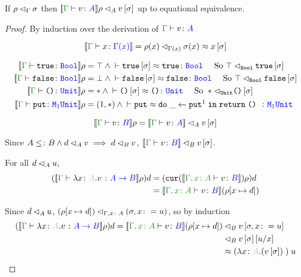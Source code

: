\documentclass{Report}
\begin{document}
\begin{theorem}
    If $\rho \lhd_{\Gamma} \sigma$ then $\logRel{\deno{\gtyperelation{v}{A}}\rho}{A}{v\ssi}$ up to equational equivalence.    
\end{theorem}

\begin{proof}
    By induction over the derivation of $\gtyperelation{v}{A}$

    \begin{equation}
        \deno{\gtyperelation{x}{\G(x)}} = \logRel{\rho(x)}{\G(x)}{\si(x)}\beequiv x\ssi
    \end{equation}

    \begin{align}
        \deno{\gtyperelation{\t}{\B}} \rho & = \top \wedge \zberelation{\t\ssi}{\t}{\B} \qt{ So } \logRel{\top}{\B}{\t\ssi}\\
        \deno{\gtyperelation{\f}{\B}} \rho & = \bot \wedge \zberelation{\f\ssi}{\f}{\B} \qt{ So } \logRel{\top}{\B}{\f\ssi}\\
        \deno{\gtyperelation{\u}{\U}} \rho & = \singleton \wedge \zberelation{\u\ssi}{\u}{\U} \qt{ So } \logRel{\singleton}{\U}{\u\ssi}\\
        \deno{\gtyperelation{\put}{\M{1}{\U}}} \rho & = (1, \singleton)\wedge \zberelation{\put}{\doin{\_}{\put^1}{\return{\u}}}{\M{1}{\U}}\\ 
    \end{align}



    \begin{equation}
        \deno{\gtyperelation{v}{B}}\rho = \logRel{\deno{\gtyperelation{v}{A}}}{A}{v\ssi}
    \end{equation}

    Since $A\leq\colon B \wedge d \lhd_{A} v \implies d \lhd_{B} v$, $\logRel{\deno{\gtyperelation{v}{B}}}{B}{v\ssi}$.


    For all $d \lhd_{A} u$, 
    \begin{align}
        (\deno{\gtyperelation{\lam{x}{A}{v}}{\ab}}\rho)d & = (\cur{\deno{\typerelation{\gax}{v}{B}}}\rho)d\\
        & = \deno{\typerelation{\gax}{v}{B}}(\rho[x\mapsto d])\\
    \end{align}

    Since $d \lhd_{A} u$, $(\rho[x\mapsto d]) \lhd_{\Gamma, x\colon A} (\sigma, x\colon= u)$, so by induction
    \begin{align}
        (\deno{\gtyperelation{\lam{x}{A}{v}}{\ab}}\rho)d = \logRel{\deno{\typerelation{\gax}{v}{B}}(\rho[x\mapsto d])&}{B}{v\sub{\si, x\setto u}}
        \\
        \logRel{&}{B}{v\ssi\ssub{x}{u}}\\
        & \beequiv \apply{(\lam{x}{A}{(v\ssi)})}{u}
    \end{align}
\end{proof}
\end{document}
